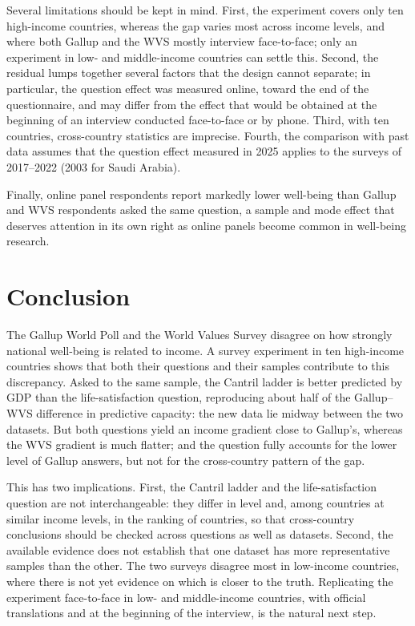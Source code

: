 \documentclass[12pt]{article}
\begin{document}
Several limitations should be kept in mind. First, the experiment covers only ten high-income countries, whereas the gap varies most across income levels, and where both Gallup and the WVS mostly interview face-to-face; only an experiment in low- and middle-income countries can settle this. Second, the residual lumps together several factors that the design cannot separate; in particular, the question effect was measured online, toward the end of the questionnaire, and may differ from the effect that would be obtained at the beginning of an interview conducted face-to-face or by phone. Third, with ten countries, cross-country statistics are imprecise. Fourth, the comparison with past data assumes that the question effect measured in 2025 applies to the surveys of 2017--2022 (2003 for Saudi Arabia).


Finally, online panel respondents report markedly lower well-being than Gallup and WVS respondents asked the same question, a sample and mode effect that deserves attention in its own right as online panels become common in well-being research.

\section{Conclusion}\label{sec:conclusion}

The Gallup World Poll and the World Values Survey disagree on how strongly national well-being is related to income. A survey experiment in ten high-income countries shows that both their questions and their samples contribute to this discrepancy. Asked to the same sample, the Cantril ladder is better predicted by GDP than the life-satisfaction question, reproducing about half of the Gallup--WVS difference in predictive capacity: the new data lie midway between the two datasets. But both questions yield an income gradient close to Gallup's, whereas the WVS gradient is much flatter; and the question fully accounts for the lower level of Gallup answers, but not for the cross-country pattern of the gap.

This has two implications. First, the Cantril ladder and the life-satisfaction question are not interchangeable: they differ in level and, among countries at similar income levels, in the ranking of countries, so that cross-country conclusions should be checked across questions as well as datasets. Second, the available evidence does not establish that one dataset has more representative samples than the other. The two surveys disagree most in low-income countries, where there is not yet evidence on which is closer to the truth. Replicating the experiment face-to-face in low- and middle-income countries, with official translations and at the beginning of the interview, is the natural next step.
\end{document}
